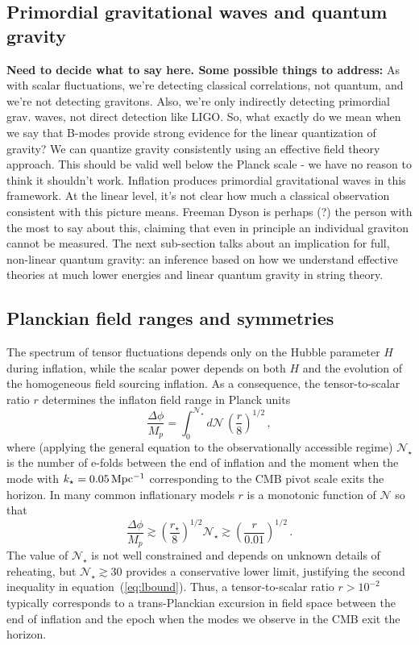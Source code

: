 \subsection{Primordial gravitational waves and quantum gravity}
{\bf Need to decide what to say here. Some possible things to address:} As with scalar fluctuations, we're detecting classical correlations, not quantum, and we're not detecting gravitons. Also, we're only indirectly detecting primordial grav. waves, not direct detection like LIGO. So, what exactly do we mean when we say that B-modes provide strong evidence for the linear quantization of gravity? We can quantize gravity consistently using an effective field theory approach. This should be valid well below the Planck scale - we have no reason to think it shouldn't work. Inflation produces primordial gravitational waves in this framework. At the linear level, it's not clear how much a classical observation consistent with this picture means. Freeman Dyson is perhaps (?) the person with the most to say about this, claiming that even in principle an individual graviton cannot be measured. The next sub-section talks about an implication for full, non-linear quantum gravity: an inference based on how we understand effective theories at much lower energies and linear quantum gravity in string theory.

\subsection{Planckian field ranges and symmetries}
The spectrum of tensor fluctuations depends only on the Hubble parameter $H$ during inflation, while the scalar power depends on both $H$ and the evolution of the homogeneous field sourcing inflation. As a consequence, the tensor-to-scalar ratio $r$ determines the inflaton field range in Planck units~\cite{Lyth:1996im}
\begin{equation}
\label{eq:Lyth}
\frac{\Delta\phi}{M_p}=\int_0^{\mathcal{N}_\star}d\mathcal{N}\,\left(\frac{r}{8}\right)^{1/2}\,,
\end{equation}
where (applying the general equation to the observationally accessible regime) $\mathcal{N}_\star$ is the number of e-folds between the end of inflation and the moment when the mode with $k_\star=0.05\,{\rm Mpc^{-1}}$ corresponding to the CMB pivot scale exits the horizon. In many common inflationary models $r$ is a monotonic function of $\mathcal{N}$ so that
\begin{equation}
\label{eq:lbound}
\frac{\Delta\phi}{M_p}\gtrsim \left(\frac{r_\star}{8}\right)^{1/2}\mathcal{N}_\star\gtrsim \left(\frac{r}{0.01}\right)^{1/2}\,.
\end{equation}  
The value of $\mathcal{N}_\star$ is not well constrained and depends on unknown details of reheating, but $\mathcal{N}_\star\gtrsim 30$ provides a conservative lower limit, justifying the second inequality in equation~(\ref{eq:lbound}). Thus, a tensor-to-scalar ratio $r>10^{-2}$ typically corresponds to a trans-Planckian excursion in field space between the end of inflation and the epoch when the modes we observe in the CMB exit the horizon.

